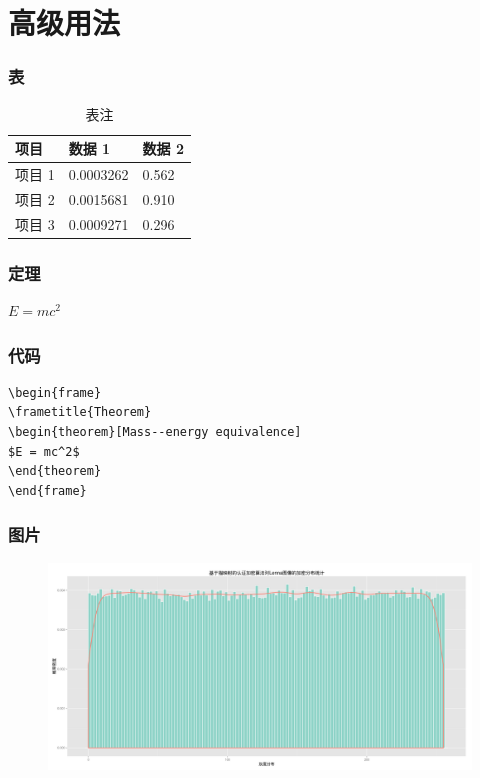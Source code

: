 \documentclass{beamer}
\begin{document}
\section{高级用法}

\begin{frame}
\frametitle{表}
\begin{table}
\begin{tabular}{l l l}
\toprule
\textbf{项目} & \textbf{数据 1} & \textbf{数据 2}\\
\midrule
项目 1 & 0.0003262 & 0.562 \\
项目 2 & 0.0015681 & 0.910 \\
项目 3 & 0.0009271 & 0.296 \\
\bottomrule
\end{tabular}
\caption{表注}
\end{table}
\end{frame}


\begin{frame}
\frametitle{定理}
\begin{theorem}[质量守恒]
$E = mc^2$
\end{theorem}
\end{frame}


\begin{frame}[fragile] %
\frametitle{代码}
\begin{example}[上页的代码]
\begin{verbatim}
\begin{frame}
\frametitle{Theorem}
\begin{theorem}[Mass--energy equivalence]
$E = mc^2$
\end{theorem}
\end{frame}\end{verbatim}
\end{example}
\end{frame}


\begin{frame}
\frametitle{图片}
\begin{figure}
\includegraphics[width=0.8\linewidth]{./images/histogram.png}
\end{figure}
\end{frame}
\end{document}
